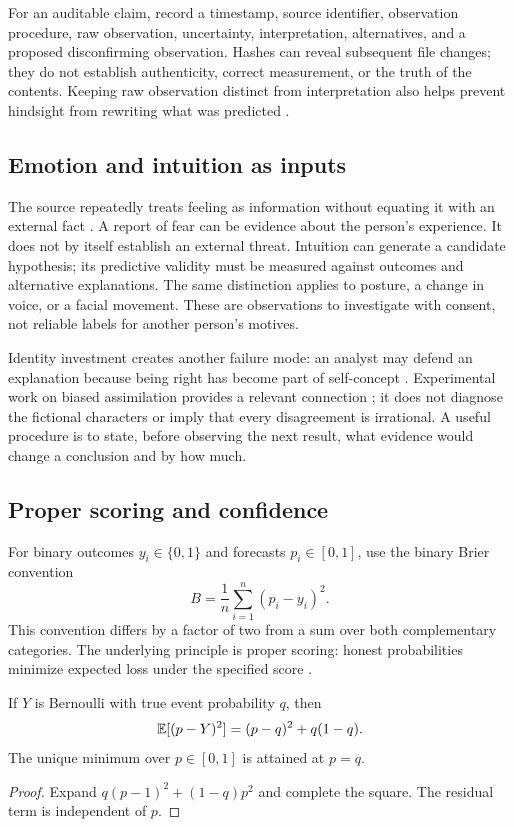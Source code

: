 For an auditable claim, record a timestamp, source identifier, observation procedure, raw observation, uncertainty, interpretation, alternatives, and a proposed disconfirming observation. Hashes can reveal subsequent file changes; they do not establish authenticity, correct measurement, or the truth of the contents. Keeping raw observation distinct from interpretation also helps prevent hindsight from rewriting what was predicted .

\subsection{Emotion and intuition as inputs}
The source repeatedly treats feeling as information without equating it with an external fact . A report of fear can be evidence about the person's experience. It does not by itself establish an external threat. Intuition can generate a candidate hypothesis; its predictive validity must be measured against outcomes and alternative explanations. The same distinction applies to posture, a change in voice, or a facial movement. These are observations to investigate with consent, not reliable labels for another person's motives.

Identity investment creates another failure mode: an analyst may defend an explanation because being right has become part of self-concept . Experimental work on biased assimilation provides a relevant connection \cite{lord}; it does not diagnose the fictional characters or imply that every disagreement is irrational. A useful procedure is to state, before observing the next result, what evidence would change a conclusion and by how much.

\subsection{Proper scoring and confidence}
For binary outcomes $y_i\in\{0,1\}$ and forecasts $p_i\in[0,1]$, use the binary Brier convention
\begin{equation}
 B=\frac{1}{n}\sum_{i=1}^{n}(p_i-y_i)^2.
 \label{eq:brier}
\end{equation}
This convention differs by a factor of two from a sum over both complementary categories. The underlying principle is proper scoring: honest probabilities minimize expected loss under the specified score \cite{brier,gneiting}.

\begin{proposition}
If $Y$ is Bernoulli with true event probability $q$, then
\begin{equation}
 \mathbb{E}[(p-Y)^2]=(p-q)^2+q(1-q).
\end{equation}
The unique minimum over $p\in[0,1]$ is attained at $p=q$.
\end{proposition}
\begin{proof}
Expand $q(p-1)^2+(1-q)p^2$ and complete the square. The residual term is independent of $p$.
\end{proof}

